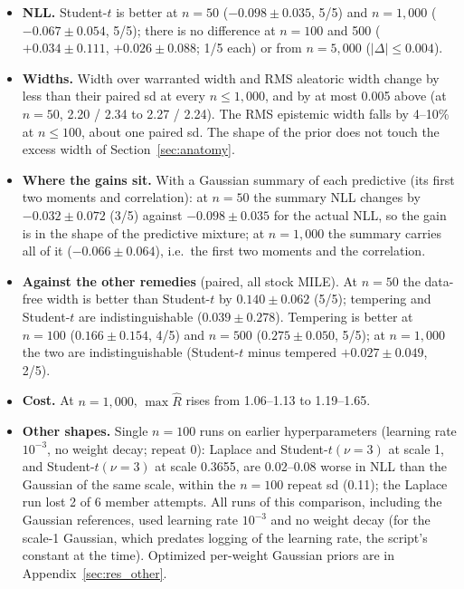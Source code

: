 \documentclass[11pt]{article}
\begin{document}
\begin{itemize}
\item \textbf{NLL.} Student-$t$ is better at $n=50$ ($-0.098\pm0.035$, 5/5) and $n=1{,}000$ ($-0.067\pm0.054$, 5/5); there is
  no difference at $n=100$ and 500 ($+0.034\pm0.111$, $+0.026\pm0.088$; 1/5 each) or from $n=5{,}000$ ($|\Delta|\le0.004$).
\item \textbf{Widths.} Width over warranted width and RMS aleatoric width change by less than their paired sd at every
  $n\le1{,}000$, and by at most 0.005 above (at $n=50$, 2.20 / 2.34 to 2.27 / 2.24). The RMS epistemic width falls by 4--10\% at $n\le100$, about one paired sd. The
  shape of the prior does not touch the excess width of Section~\ref{sec:anatomy}.
\item \textbf{Where the gains sit.} With a Gaussian summary of each predictive (its first two moments and correlation): at $n=50$ the summary NLL
  changes by $-0.032\pm0.072$ (3/5) against $-0.098\pm0.035$ for the actual NLL, so the gain is in the shape of the
  predictive mixture; at $n=1{,}000$ the summary carries all of it ($-0.066\pm0.064$), i.e.\ the first two moments and the
  correlation.
\item \textbf{Against the other remedies} (paired, all stock MILE). At $n=50$ the data-free width is better than Student-$t$ by
  $0.140\pm0.062$ (5/5); tempering and Student-$t$ are indistinguishable ($0.039\pm0.278$). Tempering is better at $n=100$
  ($0.166\pm0.154$, 4/5) and $n=500$ ($0.275\pm0.050$, 5/5); at $n=1{,}000$ the two are indistinguishable
  (Student-$t$ minus tempered $+0.027\pm0.049$, 2/5).
\item \textbf{Cost.} At $n=1{,}000$, $\max\widehat R$ rises from 1.06--1.13 to 1.19--1.65.
\item \textbf{Other shapes.} Single $n=100$ runs on earlier hyperparameters (learning rate $10^{-3}$, no weight decay; repeat 0):
  Laplace and Student-$t(\nu=3)$ at scale 1, and Student-$t(\nu=3)$ at scale 0.3655, are 0.02--0.08 worse in NLL than the
  Gaussian of the same scale, within the $n=100$ repeat sd (0.11); the Laplace run lost 2 of 6 member attempts.
  All runs of this comparison, including the Gaussian references, used learning rate $10^{-3}$ and no weight decay (for
  the scale-1 Gaussian, which predates logging of the learning rate, the script's constant at the time). Optimized
  per-weight Gaussian priors \citep{delaunoy2024lowbudget} are in Appendix~\ref{sec:res_other}.
\end{itemize}
\end{document}
